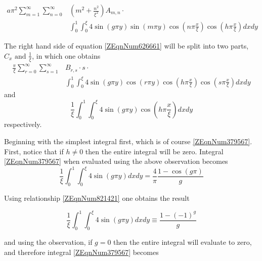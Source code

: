 \documentclass{article}
\newcommand{\spbox}[1]{ \text{ #1 }} %
\begin{document}
\begin{equation} \label{ZEqnNum923088} \begin{split} 
    a \pi ^{2} \sum _{m=1}^{\infty} \sum_{n=0}^{\infty} 
    & \left(m^{2} + \frac{n^{2}}{\xi ^{2}} \right) A_{m,n} \cdot \\
    & \int _{0}^{1} \int _{0}^{\xi} 4 \sin \left(g \pi y \right) 
    \sin \left(m\pi y\right) \cos \left(n \pi \frac{x}{\xi} \right)
    \cos \left(h \pi \frac{x}{\xi} \right) dxdy  
\end{split} \end{equation}

The right hand side of equation \eqref{ZEqnNum626661} will be split into two
parts, $C_{x} \spbox{and} \frac{1}{\xi } $, in which one obtains
\begin{equation} \label{ZEqnNum851626} \begin{split}
    \frac{\pi}{\xi} \sum _{r=0}^{\infty} \sum _{s=1}^{\infty}  
    & B_{r,s} \cdot s \cdot \\
    & \int_{0}^{1} \int _{0}^{\xi } 4 \sin \left(g \pi y\right) 
    \cos (r\pi y)\cos \left(h\pi \frac{x}{\xi} \right)\cos
    \left(s\pi \frac{x}{\xi} \right) dxdy  
\end{split} \end{equation}
and
\begin{equation} \label{ZEqnNum379567} \frac{1}{\xi } \int _{0}^{1} \int
_{0}^{\xi }4\sin \left(g\pi y\right)\cos \left(h\pi \frac{x}{\xi } \right)dxdy
\end{equation}
respectively.

Beginning with the simplest integral first, which is of course
\eqref{ZEqnNum379567}. First, notice that if $h\ne 0$ then the entire integral
will be zero. Integral \eqref{ZEqnNum379567} when evaluated using the above
observation becomes
\begin{equation*}
    \frac{1}{\xi } \int _{0}^{1} \int _{0}^{\xi }4\sin \left(g\pi y\right)dxdy
    =\frac{4}{\pi } \frac{1-\cos \left(g\pi \right)}{g} 
\end{equation*}

Using relationship \eqref{ZEqnNum821421} one obtains the result

\begin{equation*}
    \frac{1}{\xi } \int _{0}^{1} \int _{0}^{\xi }4\sin \left(g\pi y\right)dxdy
    \equiv \frac{1-\left(-1\right)^{g} }{g} 
\end{equation*}

and using the observation, if $g = 0$ then the entire integral will evaluate to
zero, and therefore integral \eqref{ZEqnNum379567} becomes
\end{document}
